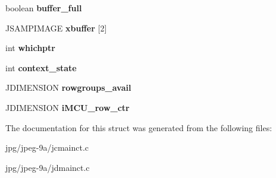 \begin{DoxyCompactItemize}
\item 
\hypertarget{structmy__main__controller_a6cd3c916b4d87c97f6fda7daa0816256}{boolean {\bfseries buffer\+\_\+full}}\label{structmy__main__controller_a6cd3c916b4d87c97f6fda7daa0816256}

\item 
\hypertarget{structmy__main__controller_a29fc35521c04489fdb6b7a7e758fb82a}{J\+S\+A\+M\+P\+I\+M\+A\+G\+E {\bfseries xbuffer} \mbox{[}2\mbox{]}}\label{structmy__main__controller_a29fc35521c04489fdb6b7a7e758fb82a}

\item 
\hypertarget{structmy__main__controller_a9838025ca47813221e8c208ad26bb9e8}{int {\bfseries whichptr}}\label{structmy__main__controller_a9838025ca47813221e8c208ad26bb9e8}

\item 
\hypertarget{structmy__main__controller_abc90e17934b16420478e95a8875918ae}{int {\bfseries context\+\_\+state}}\label{structmy__main__controller_abc90e17934b16420478e95a8875918ae}

\item 
\hypertarget{structmy__main__controller_a8fdc8a382fc0be7922e5913b16cbf7dc}{J\+D\+I\+M\+E\+N\+S\+I\+O\+N {\bfseries rowgroups\+\_\+avail}}\label{structmy__main__controller_a8fdc8a382fc0be7922e5913b16cbf7dc}

\item 
\hypertarget{structmy__main__controller_a01c8f176e423a5d8e37637fa8210b236}{J\+D\+I\+M\+E\+N\+S\+I\+O\+N {\bfseries i\+M\+C\+U\+\_\+row\+\_\+ctr}}\label{structmy__main__controller_a01c8f176e423a5d8e37637fa8210b236}

\end{DoxyCompactItemize}


The documentation for this struct was generated from the following files\+:\begin{DoxyCompactItemize}
\item 
jpg/jpeg-\/9a/jcmainct.\+c\item 
jpg/jpeg-\/9a/jdmainct.\+c\end{DoxyCompactItemize}
